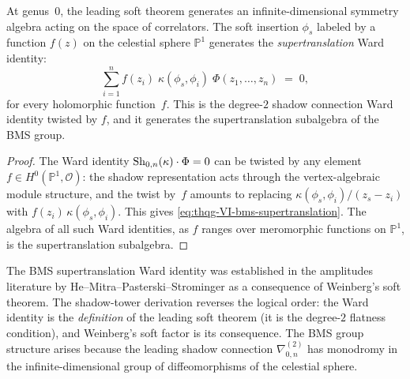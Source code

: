 \begin{corollary}
\label{cor:thqg-VI-bms-supertranslation}
At genus~$0$, the leading soft theorem generates an infinite-dimensional
symmetry algebra acting on the space of correlators. The soft
insertion $\phi_s$ labeled by a function $f(z)$ on the celestial
sphere $\mathbb{P}^1$ generates the \emph{supertranslation} Ward
identity:
\begin{equation}\label{eq:thqg-VI-bms-supertranslation}
\sum_{i=1}^{n} f(z_i)\;\kappa(\phi_s, \phi_i)\;
\Phi(z_1, \dotsc, z_n)
\;=\; 0,
\end{equation}
for every holomorphic function~$f$. This is the degree-$2$ shadow
connection Ward identity twisted by $f$, and it generates the
supertranslation subalgebra of the BMS group.
\end{corollary}

\begin{proof}
The Ward identity $\operatorname{Sh}_{0,n}(\kappa) \cdot \Phi = 0$ can be
twisted by any element $f \in H^0(\mathbb{P}^1, \mathcal{O})$:
the shadow representation acts through the vertex-algebraic
module structure, and the twist by~$f$ amounts to replacing
$\kappa(\phi_s, \phi_i)/(z_s - z_i)$ with
$f(z_i)\,\kappa(\phi_s, \phi_i)$. This gives
\eqref{eq:thqg-VI-bms-supertranslation}. The algebra of all
such Ward identities, as $f$ ranges over meromorphic functions
on $\mathbb{P}^1$, is the supertranslation subalgebra.
\end{proof}

\begin{remark}
\label{rem:thqg-VI-hmps}
The BMS supertranslation Ward identity was established in the
amplitudes literature by He--Mitra--Pasterski--Strominger
\cite{HMPS15} as a consequence of Weinberg's soft theorem.
The shadow-tower derivation reverses the logical order:
the Ward identity is the \emph{definition} of the leading
soft theorem (it is the degree-$2$ flatness condition), and
Weinberg's soft factor is its consequence. The BMS group
structure arises because the leading shadow connection
$\nabla^{(2)}_{0,n}$ has monodromy in the infinite-dimensional
group of diffeomorphisms of the celestial sphere.
\end{remark}

%
%

